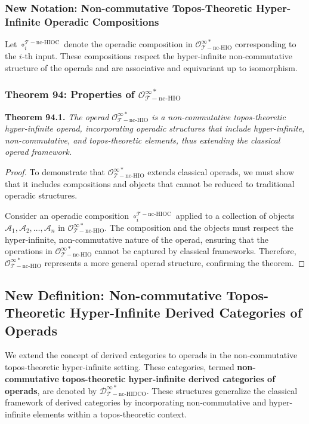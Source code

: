 \documentclass{article}
\begin{document}
\subsubsection{New Notation: Non-commutative Topos-Theoretic Hyper-Infinite Operadic Compositions}
Let \(\circ_{i}^{\mathcal{T}-\text{nc-HIOC}}\) denote the operadic composition in \(\mathcal{O}_{\mathcal{T}-\text{nc-HIO}}^{\infty *}\) corresponding to the \(i\)-th input. These compositions respect the hyper-infinite non-commutative structure of the operads and are associative and equivariant up to isomorphism.

\subsubsection{Theorem 94: Properties of \(\mathcal{O}_{\mathcal{T}-\text{nc-HIO}}^{\infty *}\)}
\textbf{Theorem 94.1.} \textit{The operad \(\mathcal{O}_{\mathcal{T}-\text{nc-HIO}}^{\infty *}\) is a non-commutative topos-theoretic hyper-infinite operad, incorporating operadic structures that include hyper-infinite, non-commutative, and topos-theoretic elements, thus extending the classical operad framework.}

\begin{proof}
To demonstrate that \(\mathcal{O}_{\mathcal{T}-\text{nc-HIO}}^{\infty *}\) extends classical operads, we must show that it includes compositions and objects that cannot be reduced to traditional operadic structures.

Consider an operadic composition \(\circ_{i}^{\mathcal{T}-\text{nc-HIOC}}\) applied to a collection of objects \(\mathcal{A}_1, \mathcal{A}_2, \dots, \mathcal{A}_n\) in \(\mathcal{O}_{\mathcal{T}-\text{nc-HIO}}^{\infty *}\). The composition and the objects must respect the hyper-infinite, non-commutative nature of the operad, ensuring that the operations in \(\mathcal{O}_{\mathcal{T}-\text{nc-HIO}}^{\infty *}\) cannot be captured by classical frameworks. Therefore, \(\mathcal{O}_{\mathcal{T}-\text{nc-HIO}}^{\infty *}\) represents a more general operad structure, confirming the theorem.
\end{proof}

\subsection{New Definition: Non-commutative Topos-Theoretic Hyper-Infinite Derived Categories of Operads}
We extend the concept of derived categories to operads in the non-commutative topos-theoretic hyper-infinite setting. These categories, termed \textbf{non-commutative topos-theoretic hyper-infinite derived categories of operads}, are denoted by \(\mathcal{D}_{\mathcal{T}-\text{nc-HIDCO}}^{\infty *}\). These structures generalize the classical framework of derived categories by incorporating non-commutative and hyper-infinite elements within a topos-theoretic context.
\end{document}
